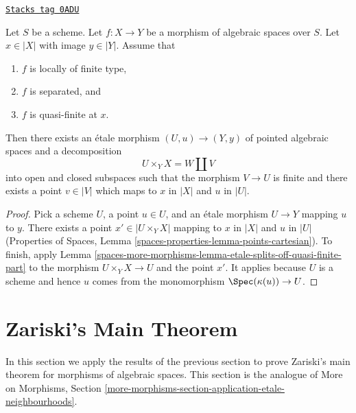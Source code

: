 \begin{lemma}
\label{spaces-more-morphisms-lemma-etale-splits-off-just-one-quasi-finite-part}
\href{https://stacks.math.columbia.edu/tag/0ADU}{\texttt{Stacks tag 0ADU}}

Let $S$ be a scheme.
Let $f : X \to Y$ be a morphism of algebraic spaces over $S$.
Let $x \in |X|$ with image $y \in |Y|$. Assume that
\begin{enumerate}
\item $f$ is locally of finite type,
\item $f$ is separated, and
\item $f$ is quasi-finite at $x$.
\end{enumerate}
Then there exists an \'etale morphism $(U, u) \to (Y, y)$
of pointed algebraic spaces and a decomposition
$$
U \times_Y X = W \amalg V
$$
into open and closed subspaces such that the morphism $V \to U$ is finite
and there exists a point $v \in |V|$ which maps to $x$ in $|X|$
and $u$ in $|U|$.
\end{lemma}

\begin{proof}
Pick a scheme $U$, a point $u \in U$, and an \'etale morphism
$U \to Y$ mapping $u$ to $y$. There exists a point $x' \in |U \times_Y X|$
mapping to $x$ in $|X|$ and $u$ in $|U|$ (Properties of Spaces,
Lemma \ref{spaces-properties-lemma-points-cartesian}).
To finish, apply Lemma \ref{spaces-more-morphisms-lemma-etale-splits-off-quasi-finite-part}
to the morphism $U \times_Y X \to U$ and the point $x'$.
It applies because $U$ is a scheme and hence $u$ comes from
the monomorphism $\Spec(\kappa(u)) \to U$.
\end{proof}

\section{Zariski's Main Theorem}
\label{spaces-more-morphisms-section-structure-quasi-finite}
In this section we apply the results of the previous section to
prove Zariski's main theorem for morphisms of algebraic spaces.
This section is the analogue of More on Morphisms, Section
\ref{more-morphisms-section-application-etale-neighbourhoods}.

